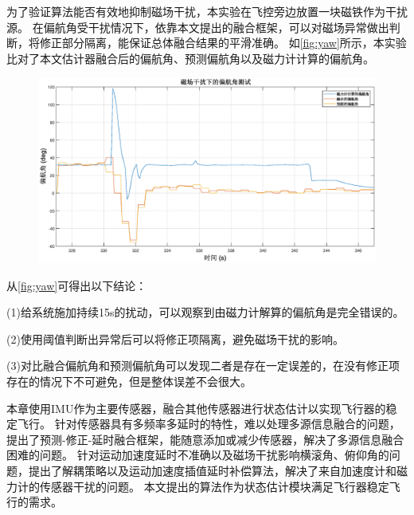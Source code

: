 \documentclass[
  type=master
]{gdutthesis}
\begin{document}
为了验证算法能否有效地抑制磁场干扰，本实验在飞控旁边放置一块磁铁作为干扰源。
在偏航角受干扰情况下，依靠本文提出的融合框架，可以对磁场异常做出判断，将修正部分隔离，能保证总体融合结果的平滑准确。
如\autoref{fig:yaw}所示，本实验比对了本文估计器融合后的偏航角、预测偏航角以及磁力计计算的偏航角。
\begin{figure}[H]
	\centering
	\includegraphics[width=1.0\textwidth]{yaw2.eps}
	\label{fig:yaw}
\end{figure}

从\autoref{fig:yaw}可得出以下结论：

(1)给系统施加持续15s的扰动，可以观察到由磁力计解算的偏航角是完全错误的。

(2)使用阈值判断出异常后可以将修正项隔离，避免磁场干扰的影响。

(3)对比融合偏航角和预测偏航角可以发现二者是存在一定误差的，在没有修正项存在的情况下不可避免，但是整体误差不会很大。

本章使用IMU作为主要传感器，融合其他传感器进行状态估计以实现飞行器的稳定飞行。
针对传感器具有多频率多延时的特性，难以处理多源信息融合的问题，提出了预测-修正-延时融合框架，能随意添加或减少传感器，解决了多源信息融合困难的问题。
针对运动加速度延时不准确以及磁场干扰影响横滚角、俯仰角的问题，提出了解耦策略以及运动加速度插值延时补偿算法，解决了来自加速度计和磁力计的传感器干扰的问题。
本文提出的算法作为状态估计模块满足飞行器稳定飞行的需求。
\end{document}
